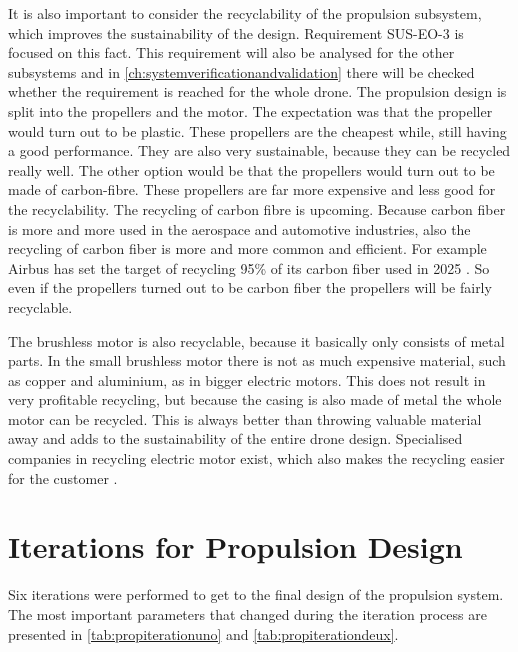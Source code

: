 It is also important to consider the recyclability of the propulsion subsystem, which improves the sustainability of the design. Requirement SUS-EO-3 is focused on this fact. This requirement will also be analysed for the other subsystems and in \autoref{ch:systemverificationandvalidation} there will be checked whether the requirement is reached for the whole drone. The propulsion design is split into the propellers and the motor. The expectation was that the propeller would turn out to be plastic. These propellers are the cheapest while, still having a good performance. They are also very sustainable, because they can be recycled really well. The other option would be that the propellers would turn out to be made of carbon-fibre. These propellers are far more expensive and less good for the recyclability. The recycling of carbon fibre is upcoming. Because carbon fiber is more and more used in the aerospace and automotive industries, also the recycling of carbon fiber is more and more common and efficient. For example Airbus has set the target of recycling 95\% of its carbon fiber used in 2025 \cite{carbonfiberrecycle}. So even if the propellers turned out to be carbon fiber the propellers will be fairly recyclable.

The brushless motor is also recyclable, because it basically only consists of metal parts. In the small brushless motor there is not as much expensive material, such as copper and aluminium, as in bigger electric motors. This does not result in very profitable recycling, but because the casing is also made of metal the whole motor can be recycled. This is always better than throwing valuable material away and adds to the sustainability of the entire drone design. Specialised companies in recycling electric motor exist, which also makes the recycling easier for the customer \cite{motorrecycle}.  

\section{Iterations for Propulsion Design}
\label{sec:propiteration}

Six iterations were performed to get to the final design of the propulsion system. The most important parameters that changed during the iteration process are presented in \autoref{tab:propiterationuno} and \autoref{tab:propiterationdeux}.

